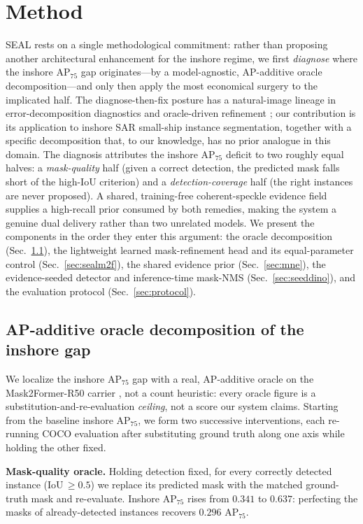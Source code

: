 \documentclass[journal]{IEEEtran}
\begin{document}
\section{Method}
\label{sec:method}
SEAL rests on a single methodological commitment: rather than proposing another architectural enhancement for the inshore regime, we first \emph{diagnose} where the inshore AP$_{75}$ gap originates---by a model-agnostic, AP-additive oracle decomposition---and only then apply the most economical surgery to the implicated half. The diagnose-then-fix posture has a natural-image lineage in error-decomposition diagnostics and oracle-driven refinement \cite{tang2021bpr,kirillov2020pointrend}; our contribution is its application to inshore SAR small-ship instance segmentation, together with a specific decomposition that, to our knowledge, has no prior analogue in this domain. The diagnosis attributes the inshore AP$_{75}$ deficit to two roughly equal halves: a \emph{mask-quality} half (given a correct detection, the predicted mask falls short of the high-IoU criterion) and a \emph{detection-coverage} half (the right instances are never proposed). A shared, training-free coherent-speckle evidence field supplies a high-recall prior consumed by both remedies, making the system a genuine dual delivery rather than two unrelated models. We present the components in the order they enter this argument: the oracle decomposition (Sec.~\ref{sec:oracle}), the lightweight learned mask-refinement head and its equal-parameter control (Sec.~\ref{sec:sealm2f}), the shared evidence prior (Sec.~\ref{sec:mne}), the evidence-seeded detector and inference-time mask-NMS (Sec.~\ref{sec:seeddino}), and the evaluation protocol (Sec.~\ref{sec:protocol}).

\subsection{AP-additive oracle decomposition of the inshore gap}
\label{sec:oracle}
We localize the inshore AP$_{75}$ gap with a real, AP-additive oracle on the Mask2Former-R50 carrier \cite{cheng2022mask2former}, not a count heuristic: every oracle figure is a substitution-and-re-evaluation \emph{ceiling}, not a score our system claims. Starting from the baseline inshore AP$_{75}$, we form two successive interventions, each re-running COCO evaluation after substituting ground truth along one axis while holding the other fixed.

\textbf{Mask-quality oracle.} Holding detection fixed, for every correctly detected instance (IoU$\,\ge\!0.5$) we replace its predicted mask with the matched ground-truth mask and re-evaluate. Inshore AP$_{75}$ rises from $0.341$ to $0.637$: perfecting the masks of already-detected instances recovers $0.296$ AP$_{75}$.
\end{document}
